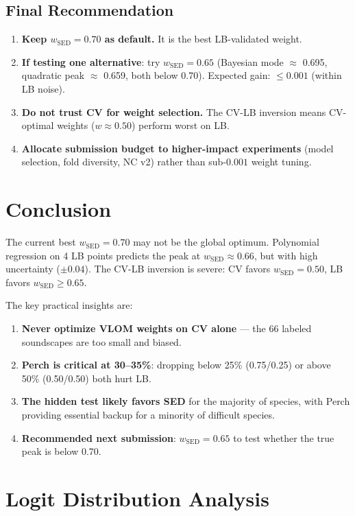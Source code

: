 \documentclass[a4paper,11pt]{article}
\begin{document}
\subsection{Final Recommendation}

\begin{enumerate}
\item \textbf{Keep $w_\text{SED}=0.70$ as default.} It is the best LB-validated weight.
\item \textbf{If testing one alternative}: try $w_\text{SED}=0.65$ (Bayesian mode $\approx$ 0.695, quadratic peak $\approx$ 0.659, both below 0.70). Expected gain: $\leq 0.001$ (within LB noise).
\item \textbf{Do not trust CV for weight selection.} The CV-LB inversion means CV-optimal weights ($w \approx 0.50$) perform worst on LB.
\item \textbf{Allocate submission budget to higher-impact experiments} (model selection, fold diversity, NC v2) rather than sub-$0.001$ weight tuning.
\end{enumerate}

\section{Conclusion}

The current best $w_\text{SED}=0.70$ may not be the global optimum.
Polynomial regression on 4 LB points predicts the peak at $w_\text{SED} \approx 0.66$, but with high uncertainty ($\pm 0.04$).
The CV-LB inversion is severe: CV favors $w_\text{SED}=0.50$, LB favors $w_\text{SED} \geq 0.65$.

The key practical insights are:
\begin{enumerate}
\item \textbf{Never optimize VLOM weights on CV alone} --- the 66 labeled soundscapes are too small and biased.
\item \textbf{Perch is critical at 30--35\%}: dropping below 25\% (0.75/0.25) or above 50\% (0.50/0.50) both hurt LB.
\item \textbf{The hidden test likely favors SED} for the majority of species, with Perch providing essential backup for a minority of difficult species.
\item \textbf{Recommended next submission}: $w_\text{SED}=0.65$ to test whether the true peak is below 0.70.
\end{enumerate}

\section{Logit Distribution Analysis}
\end{document}
